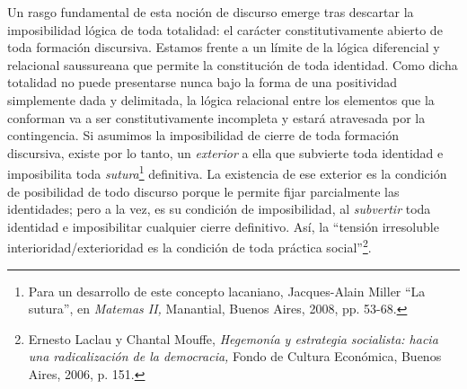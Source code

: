 Un rasgo fundamental de esta noción de discurso emerge tras descartar la imposibilidad lógica de toda totalidad: el carácter constitutivamente abierto de toda formación discursiva. Estamos frente a un límite de la lógica diferencial y relacional saussureana que permite la constitución de toda identidad. Como dicha totalidad no puede presentarse nunca bajo la forma de una positividad simplemente dada y delimitada, la lógica relacional entre los elementos que la conforman va a ser constitutivamente incompleta y estará atravesada por la contingencia. Si asumimos la imposibilidad de cierre de toda formación discursiva, existe por lo tanto, un \emph{exterior} a ella que subvierte toda identidad e imposibilita toda \emph{sutura}\footnote{Para un desarrollo de este concepto lacaniano, Jacques-Alain Miller \enquote{La sutura}, en \emph{Matemas II,} Manantial, Buenos Aires, 2008, pp. 53-68.} definitiva. La existencia de ese exterior  es la condición de posibilidad de todo discurso porque le permite fijar parcialmente las identidades; pero a la vez, es su condición de imposibilidad, al \emph{subvertir} toda identidad e imposibilitar cualquier cierre definitivo. Así, la \enquote{tensión irresoluble interioridad/exterioridad es la condición de toda práctica social}\footnote{Ernesto Laclau y Chantal Mouffe, \emph{Hegemonía y estrategia socialista: hacia una radicalización de la democracia,} Fondo de Cultura Económica, Buenos Aires, 2006, p. 151.}.

